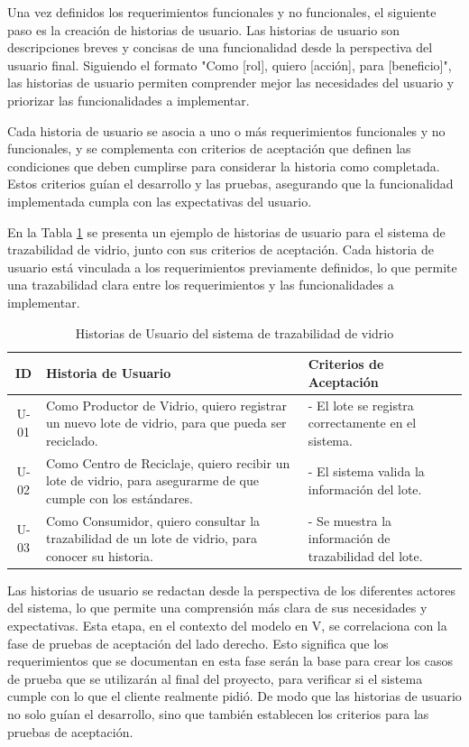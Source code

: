 Una vez definidos los requerimientos funcionales y no funcionales, el siguiente paso es la creación de historias de usuario. Las historias de usuario son descripciones breves y concisas de una funcionalidad desde la perspectiva del usuario final. Siguiendo el formato "Como [rol], quiero [acción], para [beneficio]", las historias de usuario permiten comprender mejor las necesidades del usuario y priorizar las funcionalidades a implementar.

Cada historia de usuario se asocia a uno o más requerimientos funcionales y no funcionales, y se complementa con criterios de aceptación que definen las condiciones que deben cumplirse para considerar la historia como completada. Estos criterios guían el desarrollo y las pruebas, asegurando que la funcionalidad implementada cumpla con las expectativas del usuario.

En la Tabla \ref{tab:user-stories} se presenta un ejemplo de historias de usuario para el sistema de trazabilidad de vidrio, junto con sus criterios de aceptación. Cada historia de usuario está vinculada a los requerimientos previamente definidos, lo que permite una trazabilidad clara entre los requerimientos y las funcionalidades a implementar.

\begin{table}[!htpb]
	\centering
	\caption{Historias de Usuario del sistema de trazabilidad de vidrio}
	\label{tab:user-stories}
	\begin{tabular}{|c|p{8cm}|p{4cm}|}
		\hline
		\textbf{ID} & \textbf{Historia de Usuario} & \textbf{Criterios de Aceptación} \\
		\hline
		U-01 & Como Productor de Vidrio, quiero registrar un nuevo lote de vidrio, para que pueda ser reciclado. & - El lote se registra correctamente en el sistema. \\
		U-02 & Como Centro de Reciclaje, quiero recibir un lote de vidrio, para asegurarme de que cumple con los estándares. & - El sistema valida la información del lote. \\
		U-03 & Como Consumidor, quiero consultar la trazabilidad de un lote de vidrio, para conocer su historia. & - Se muestra la información de trazabilidad del lote. \\
		\hline
	\end{tabular}
\end{table}

Las historias de usuario se redactan desde la perspectiva de los diferentes actores del sistema, lo que permite una comprensión más clara de sus necesidades y expectativas. Esta etapa, en el contexto del modelo en V, se correlaciona con la fase de pruebas de aceptación del lado derecho. Esto significa que los requerimientos que se documentan en esta fase serán la base para crear los casos de prueba que se utilizarán al final del proyecto, para verificar si el sistema cumple con lo que el cliente realmente pidió. De modo que las historias de usuario no solo guían el desarrollo, sino que también establecen los criterios para las pruebas de aceptación.

